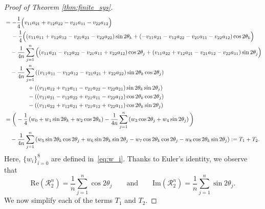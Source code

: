 \documentclass[10pt]{article}
\theoremstyle{definition}
\theoremstyle{definition}
\numberwithin{equation}{section}
\newcommand{\CR}{\mathcal{R}}
\newcommand{\IM}[1]{\mathrm{Im}\left(#1\right)}
\newcommand{\RE}[1]{\mathrm{Re}\left(#1\right)}
\begin{document}
\begin{proof}[Proof of Theorem \ref{thm:finite_sys}]
\begin{align}
        &=-\frac{1}{4}\Big(v_{11}a_{21} +v_{12}a_{22} - v_{21}a_{11} - v_{22}a_{12} \Big)
        \\ 
        &\quad\,-\frac{1}{4}\Big((v_{11}a_{11}+v_{12}a_{12} - v_{21}a_{21} - v_{22}a_{22}) \sin 2 \theta_k  + (-v_{11}a_{21}- v_{12}a_{22} - v_{21}a_{11} - v_{22}a_{12}) \cos 2\theta_k\Big) \notag \\
        &\quad-\frac{1}{4n} \sum_{j=1}^n \Big((v_{11}a_{21} - v_{12}a_{22}-v_{21}a_{11} + v_{22}a_{12}) \cos 2\theta_j + (v_{11}a_{22}+v_{12}a_{21}-v_{21}a_{12} - v_{22}a_{11}) \sin 2\theta_j \Big) \notag\\
        &\quad-\frac{1}{4n} \sum_{j=1}^n \left((v_{11}a_{11}- v_{12}a_{12} - v_{21}a_{21} + v_{22}a_{22}) \sin 2 \theta_k \cos 2\theta_j\right) \notag\\
        &\qquad \qquad + \left((v_{11}a_{12}+v_{12}a_{11}-v_{21}a_{22}-v_{22}a_{21}) \sin 2 \theta_k \sin 2\theta_j\right) \notag\\
        &\qquad \qquad - \left((v_{11}a_{21} -v_{12}a_{22} + v_{21}a_{11}- v_{22}a_{12}) \cos 2\theta_k \cos 2\theta_j\right) \notag \\
        &\qquad \qquad - \left((v_{11}a_{22} + v_{12}a_{21} + v_{21}a_{12} + v_{22}a_{11}) \cos 2\theta_k \sin 2\theta_j \right) \notag\\
        &= \bigg(-\frac{1}{4}\left(w_0 + w_1 \sin 2 \theta_k + w_2 \cos 2\theta_k\right) -\frac{1}{4n} \sum_{j=1}^n \left(w_3 \cos 2\theta_j + w_4 \sin 2\theta_j\right) \bigg) \notag\\
        &\quad-\frac{1}{4n} \sum_{j=1}^n \left(w_5 \sin 2 \theta_k \cos 2\theta_j + w_6 \sin 2 \theta_k \sin 2\theta_j - w_7 \cos 2\theta_k \cos 2\theta_j - w_8 \cos 2\theta_k \sin 2\theta_j \right) := T_1 + T_2. \notag
    \end{align}
    Here, $\{w_i\}_{i=0}^8$ are defined in~\eqref{eq:w_i}. Thanks to Euler's identity, we observe that
    \begin{equation*}\label{eq:order_para_finite_sum}
        \RE{\CR_2^n}
        = \frac{1}{n} \sum_{j=1}^n \cos 2\theta_j
        \qquad\text{and}\qquad
        \IM{\CR_2^n}
        = \frac{1}{n} \sum_{j=1}^n \sin 2\theta_j.
    \end{equation*}
    We now simplify each of the terms $T_1$ and $T_2$.
    

\end{proof}
\end{document}
